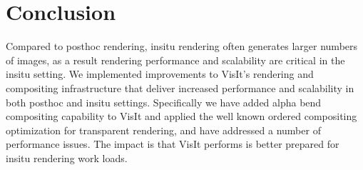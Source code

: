 \documentclass[a4paper,10pt]{report}
\begin{document}
\section{Conclusion}
Compared to posthoc rendering, insitu rendering often generates larger numbers of images, as a result rendering performance and scalability are critical in the insitu setting. We implemented improvements to VisIt's rendering and compositing infrastructure that deliver increased performance and scalability in both posthoc and insitu settings. Specifically we have added alpha bend compositing capability to VisIt and applied the well known ordered compositing optimization for transparent rendering, and have addressed a number of performance issues. The impact is that VisIt performs is better prepared for insitu rendering work loads.
\end{document}
